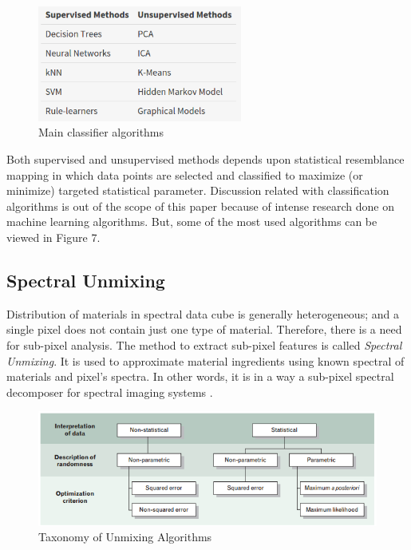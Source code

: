 \documentclass[a4paper]{article}
\begin{document}
     \begin{figure}[h]
		\includegraphics[width=0.6\textwidth]{Class.png}
			\centering
         \caption{Main classifier algorithms}
	\end{figure}
    
    \newpage
    
    \hspace{5mm} Both supervised and unsupervised methods depends upon statistical resemblance mapping in which data points are selected and classified to maximize (or minimize) targeted statistical parameter. Discussion related with classification algorithms is out of the scope of this paper because of intense research done on machine learning algorithms. But, some of the most used algorithms can be viewed in Figure 7.
    
   
    
    \subsection{Spectral Unmixing}
    
    \hspace{5mm} Distribution of materials in spectral data cube is generally heterogeneous; and a single pixel does not contain just one type of material. Therefore, there is a need for sub-pixel analysis. The method to extract sub-pixel features is called \emph{Spectral Unmixing}. It is used to approximate material ingredients using known spectral of materials and pixel's spectra. In other words, it is in a way a sub-pixel spectral decomposer for spectral imaging systems \cite{yirmi}.
    
    
     \begin{figure}[h]
		\includegraphics[width=1\textwidth]{unmix.png}
			\centering
         \caption{Taxonomy of Unmixing Algorithms \cite{yirmi}}
	\end{figure}
	\newpage
\end{document}
